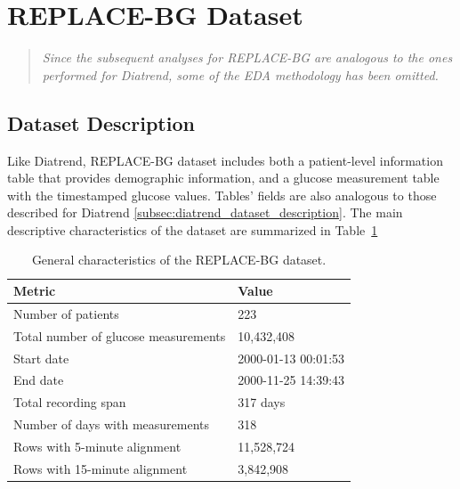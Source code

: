 \section{REPLACE-BG Dataset}
\label{sec:eda_replacebg}

\begin{quote}
\small

\textit{Since the subsequent analyses for REPLACE-BG are analogous to the ones performed for Diatrend, some of the EDA methodology has been omitted.}

\end{quote}

\subsection{Dataset Description}
\label{subsec:replacebg_dataset_description}

Like Diatrend, REPLACE-BG dataset includes both a patient-level information table that provides demographic information, and a glucose measurement table with the timestamped glucose values. Tables' fields are also analogous to those described for Diatrend \ref{subsec:diatrend_dataset_description}. The main descriptive characteristics of the dataset are summarized in Table~\ref{tab:replace_bg_general_description}

\begin{table}[htbp]
    \centering
    \caption{General characteristics of the REPLACE-BG dataset.}
    \label{tab:replace_bg_general_description}
    \begin{tabular}{ll}
        \hline
        \textbf{Metric} & \textbf{Value} \\
        \hline
        Number of patients & 223 \\
        Total number of glucose measurements & 10,432,408 \\
        \hline
        Start date & 2000-01-13 00:01:53 \\
        End date & 2000-11-25 14:39:43 \\
        Total recording span & 317 days \\
        Number of days with measurements & 318 \\
        \hline
        Rows with 5-minute alignment & 11,528,724 \\
        Rows with 15-minute alignment & 3,842,908 \\
        \hline
    \end{tabular}
\end{table}

